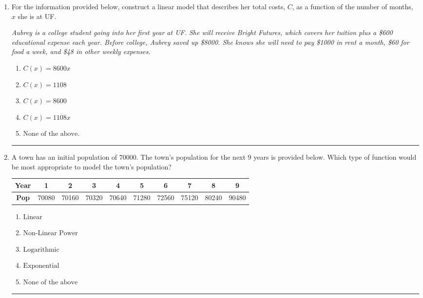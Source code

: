 \documentclass[14pt]{extbook}
\newcommand{\litem}[1]{\item#1\hspace*{-1cm}\rule{\textwidth}{0.4pt}}
\begin{document}
\begin{enumerate}
{\begin{enumerate}[label=\Alph*.]
\end{enumerate} }
\litem{
For the information provided below, construct a linear model that describes her total costs, $C$, as a function of the number of months, $x$ she is at UF. 
\begin{center}
    \textit{ Aubrey is a college student going into her first year at UF. She will receive Bright Futures, which covers her tuition plus a \$600 educational expense each year. Before college, Aubrey saved up \$8000. She knows she will need to pay \$1000 in rent a month, \$60 for food a week, and \$48 in other weekly expenses. }
\end{center}
\begin{enumerate}[label=\Alph*.]
\item \( C(x) = 8600 x \)
\item \( C(x) = 1108 \)
\item \( C(x) = 8600 \)
\item \( C(x) = 1108 x \)
\item \( \text{None of the above.} \)

\end{enumerate} }
\litem{
A town has an initial population of 70000. The town's population for the next 9 years is provided below. Which type of function would be most appropriate to model the town's population?

\begin{tabular}{c|c|c|c|c|c|c|c|c|c}
\textbf{Year} &1 &2 &3 &4 &5 &6 &7 &8 &9\tabularnewline \hline
\textbf{Pop} &70080 &70160 &70320 &70640 &71280 &72560 &75120 &80240 &90480\end{tabular}\begin{enumerate}[label=\Alph*.]
\item \( \text{Linear} \)
\item \( \text{Non-Linear Power} \)
\item \( \text{Logarithmic} \)
\item \( \text{Exponential} \)
\item \( \text{None of the above} \)


\end{enumerate}}
\end{enumerate}
\end{document}
